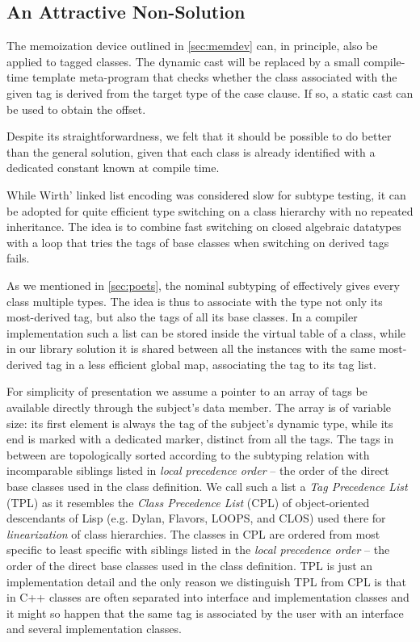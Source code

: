 \subsection{An Attractive Non-Solution}
\label{sec:cotc}

The memoization device outlined in \textsection\ref{sec:memdev} can, in principle, also be 
applied to tagged classes. The dynamic cast will be replaced by a small 
compile-time template meta-program that checks whether the class associated with 
the given tag is derived from the target type of the case clause. If so, a static 
cast can be used to obtain the offset.

Despite its straightforwardness, we felt that it should be possible to do better 
than the general solution, given that each class is already identified with a 
dedicated constant known at compile time.

While Wirth' linked list encoding was considered slow for subtype testing, it can 
be adopted for quite efficient type switching on a class hierarchy with no 
repeated inheritance. The idea is to combine fast switching on closed 
algebraic datatypes with a loop that tries the tags of base classes when 
switching on derived tags fails.

As we mentioned in \textsection\ref{sec:poets}, 
the nominal subtyping of \Cpp{} effectively gives every class multiple types. The 
idea is thus to associate with the type not only its most-derived tag, but also 
the tags of all its base classes. In a compiler implementation such a 
list can be stored inside the virtual table of a class, while in our library 
solution it is shared between all the instances with the same most-derived tag 
in a less efficient global map, associating the tag to its tag list.

For simplicity of presentation we assume a pointer to an array of tags be available 
directly through the subject's  data member. The array is of 
variable size: its first element is always the tag of the subject's dynamic 
type, while its end is marked with a dedicated  marker, 
distinct from all the tags. The tags in between are topologically sorted 
according to the subtyping relation with incomparable siblings listed in 
\emph{local precedence order} -- the order of the direct base classes used in 
the class definition. We call such a list a \emph{Tag Precedence List} (TPL) as it resembles the \emph{Class Precedence List} (CPL) of 
object-oriented descendants of Lisp (e.g. Dylan, Flavors, LOOPS, and CLOS) used 
there for \emph{linearization} of class hierarchies. 
The classes in CPL are ordered from most specific to least specific 
with siblings listed in the \emph{local precedence order} -- the order of the 
direct base classes used in the class definition. TPL is just an implementation 
detail and the only reason we distinguish TPL from CPL is that in C++ classes 
are often separated into interface and implementation classes and it might so 
happen that the same tag is associated by the user with an interface and several 
implementation classes. 

